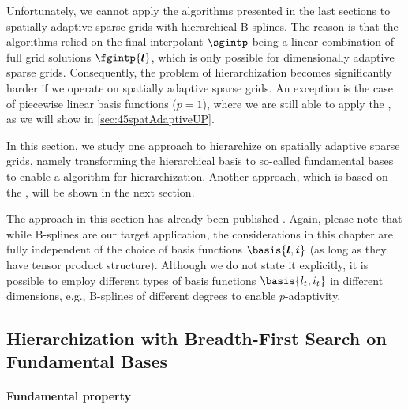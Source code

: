 \label{sec:44spatAdaptiveBFS}

Unfortunately, we cannot apply the algorithms presented in the last
sections to spatially adaptive sparse grids with
hierarchical B-splines.
The reason is that the algorithms relied on the final interpolant $\sgintp$
being a linear combination of full grid solutions $\fgintp{\*l}$,
which is only possible for dimensionally adaptive sparse grids.
Consequently, the problem of hierarchization becomes significantly
harder if we operate on spatially adaptive sparse grids.
An exception is the case of piecewise linear basis functions ($p = 1$),
where we are still able to apply the \up,
as we will show in \cref{sec:45spatAdaptiveUP}.

In this section, we study one approach to hierarchize on
spatially adaptive sparse grids,
namely transforming the hierarchical basis to so-called fundamental bases
to enable a \bfs algorithm for hierarchization.
Another approach, which is based on the \up\periodafterPspace,
will be shown in the next section.

The approach in this section has already been published
\cite{Valentin18Fundamental}.
Again, please note that while B-splines are our target application,
the considerations in this chapter are fully independent of the choice of
basis functions $\basis{\*l,\*i}$ 
(as long as they have tensor product structure).
Although we do not state it explicitly, it is possible to employ
different types of basis functions $\basis{l_t,i_t}$ in different
dimensions, e.g., B-splines of different degrees to enable $p$-adaptivity.



\subsection{Hierarchization with Breadth-First Search on Fundamental Bases}
\label{sec:441BFSFundamentalBases}

\paragraph{Fundamental property}

